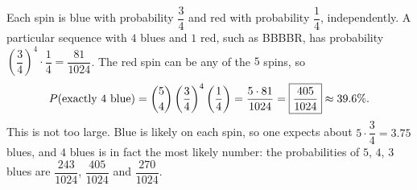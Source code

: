 Each spin is blue with probability $\dfrac{3}{4}$ and red with probability $\dfrac{1}{4}$, independently. A particular sequence with $4$ blues and $1$ red, such as BBBBR, has probability $\left(\dfrac{3}{4}\right)^4\cdot\dfrac{1}{4}=\dfrac{81}{1024}$. The red spin can be any of the $5$ spins, so
\[
P(\text{exactly 4 blue})=\dbinom54\left(\dfrac{3}{4}\right)^4\left(\dfrac{1}{4}\right)=\dfrac{5\cdot81}{1024}=\boxed{\dfrac{405}{1024}}\approx39.6\%.
\]
This is not too large. Blue is likely on each spin, so one expects about $5\cdot\dfrac{3}{4}=3.75$ blues, and $4$ blues is in fact the most likely number: the probabilities of $5$, $4$, $3$ blues are $\dfrac{243}{1024}$, $\dfrac{405}{1024}$ and $\dfrac{270}{1024}$.
